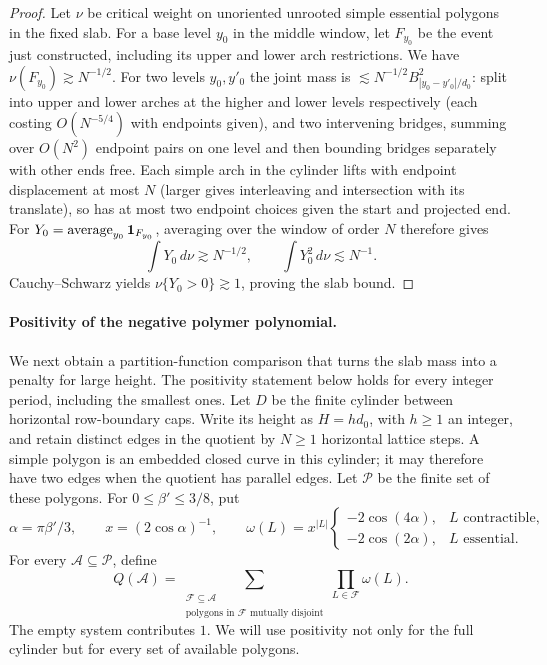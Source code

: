 \begin{proof}
Let \(\nu\) be critical weight on unoriented unrooted simple essential polygons in the fixed slab. For a base level \(y_0\) in the middle window, let \(F_{y_0}\) be the event just constructed, including its upper and lower arch restrictions. We have \(\nu(F_{y_0})\gtrsim N^{-1/2}\). For two levels \(y_0,y'_0\) the joint mass is \(\lesssim N^{-1/2} B_{|y_0-y'_0|/d_0}^2\): split into upper and lower arches at the higher and lower levels respectively (each costing \(O(N^{-5/4})\) with endpoints given), and two intervening bridges, summing over \(O(N^2)\) endpoint pairs on one level and then bounding bridges separately with other ends free. Each simple arch in the cylinder lifts with endpoint displacement at most \(N\) (larger gives interleaving and intersection with its translate), so has at most two endpoint choices given the start and projected end. For \(Y_0=\mathop{\mathrm{average}}_{y_0}{\bf1}_{F_{y_0}}\), averaging over the window of order \(N\) therefore gives
\[
 \int Y_0\,d\nu\gtrsim N^{-1/2},\qquad
 \int Y_0^2\,d\nu\lesssim N^{-1}.
\]
Cauchy--Schwarz yields \(\nu\{Y_0>0\}\gtrsim1\), proving the slab bound.

\end{proof}

\paragraph{Positivity of the negative polymer polynomial.}
We next obtain a partition-function comparison that turns the slab mass into a penalty for large height. The positivity statement below holds for every integer period, including the smallest ones. Let $D$ be the finite cylinder between horizontal row-boundary caps. Write its height as $H=h d_0$, with $h\ge1$ an integer, and retain distinct edges in the quotient by $N\ge1$ horizontal lattice steps. A simple polygon is an embedded closed curve in this cylinder; it may therefore have two edges when the quotient has parallel edges. Let $\mathcal P$ be the finite set of these polygons. For $0\le\beta'\le3/8$, put
\[
 \alpha=\pi\beta'/3,\qquad x=(2\cos\alpha)^{-1},\qquad
 \omega(L)=x^{|L|}\begin{cases}
 -2\cos(4\alpha),&L\text{ contractible},\\
 -2\cos(2\alpha),&L\text{ essential}.
 \end{cases}
\]
For every $\mathcal A\subseteq\mathcal P$, define
\[
 Q(\mathcal A)=\sum_{\substack{\mathcal F\subseteq\mathcal A\\
                         \text{polygons in }\mathcal F\text{ mutually disjoint}}}
                  \prod_{L\in\mathcal F}\omega(L).
\]
The empty system contributes $1$. We will use positivity not only for the full cylinder but for every set of available polygons.

